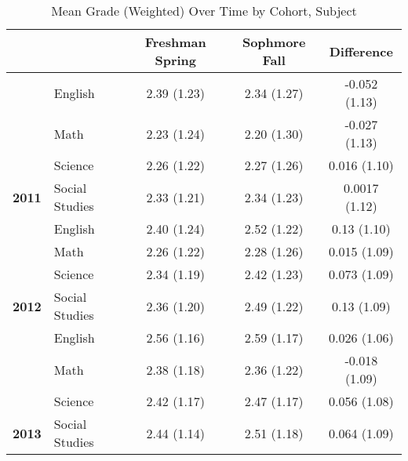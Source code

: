 \begin{table}[!h]

\caption{\label{tab:table_grade_desc}Mean Grade (Weighted) Over Time by Cohort, Subject}
\centering
\begin{tabular}[t]{>{}llccc}
\toprule
 &  & Freshman Spring & Sophmore Fall & Difference\\
\midrule
 & English & 2.39 (1.23) & 2.34 (1.27) & -0.052 (1.13)\\

 & Math & 2.23 (1.24) & 2.20 (1.30) & -0.027 (1.13)\\

 & Science & 2.26 (1.22) & 2.27 (1.26) & 0.016 (1.10)\\

\multirow{-4}{*}{\raggedright\arraybackslash \textbf{2011}} & Social Studies & 2.33 (1.21) & 2.34 (1.23) & 0.0017 (1.12)\\
\cmidrule{1-5}
 & English & 2.40 (1.24) & 2.52 (1.22) & 0.13 (1.10)\\

 & Math & 2.26 (1.22) & 2.28 (1.26) & 0.015 (1.09)\\

 & Science & 2.34 (1.19) & 2.42 (1.23) & 0.073 (1.09)\\

\multirow{-4}{*}{\raggedright\arraybackslash \textbf{2012}} & Social Studies & 2.36 (1.20) & 2.49 (1.22) & 0.13 (1.09)\\
\cmidrule{1-5}
 & English & 2.56 (1.16) & 2.59 (1.17) & 0.026 (1.06)\\

 & Math & 2.38 (1.18) & 2.36 (1.22) & -0.018 (1.09)\\

 & Science & 2.42 (1.17) & 2.47 (1.17) & 0.056 (1.08)\\

\multirow{-4}{*}{\raggedright\arraybackslash \textbf{2013}} & Social Studies & 2.44 (1.14) & 2.51 (1.18) & 0.064 (1.09)\\
\bottomrule
\end{tabular}
\end{table}
